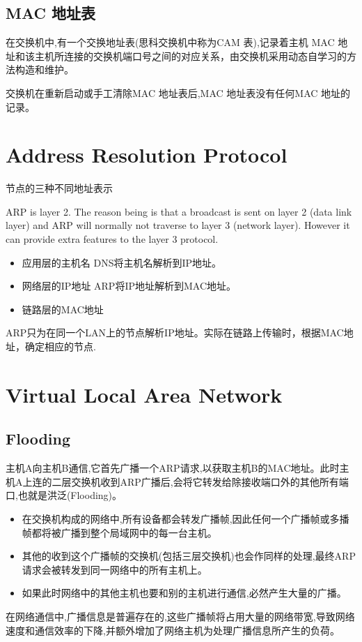 \documentclass[a4paper]{report}
\begin{document}
\subsection{MAC 地址表}
在交换机中,有一个交换地址表(思科交换机中称为CAM 表),记录着主机 MAC 地址和该主机所连接的交换机端口号之间的对应关系，由交换机采用动态自学习的方法构造和维护。 

交换机在重新启动或手工清除MAC 地址表后,MAC 地址表没有任何MAC 地址的记录。 

\section{Address Resolution Protocol}
节点的三种不同地址表示

ARP is layer 2. The reason being is that a broadcast is sent on layer 2 (data link layer) and ARP will normally not traverse to layer 3 (network layer). However it can provide extra features to the layer 3 protocol.
\begin{itemize}
  \item 应用层的主机名
  \subitem DNS将主机名解析到IP地址。
  \item 网络层的IP地址
  \subitem ARP将IP地址解析到MAC地址。
  \item 链路层的MAC地址
\end{itemize}
ARP只为在同一个LAN上的节点解析IP地址。实际在链路上传输时，根据MAC地址，确定相应的节点. 
\section{Virtual Local Area Network}
\subsection{Flooding}
主机A向主机B通信,它首先广播一个ARP请求,以获取主机B的MAC地址。此时主机A上连的二层交换机收到ARP广播后,会将它转发给除接收端口外的其他所有端口,也就是洪泛(Flooding)。
\begin{itemize}
  \item 在交换机构成的网络中,所有设备都会转发广播帧,因此任何一个广播帧或多播帧都将被广播到整个局域网中的每一台主机。
  \item 其他的收到这个广播帧的交换机(包括三层交换机)也会作同样的处理,最终ARP 请求会被转发到同一网络中的所有主机上。
  \item 如果此时网络中的其他主机也要和别的主机进行通信,必然产生大量的广播。
\end{itemize}
在网络通信中,广播信息是普遍存在的,这些广播帧将占用大量的网络带宽,导致网络速度和通信效率的下降,并额外增加了网络主机为处理广播信息所产生的负荷。 
\end{document}
